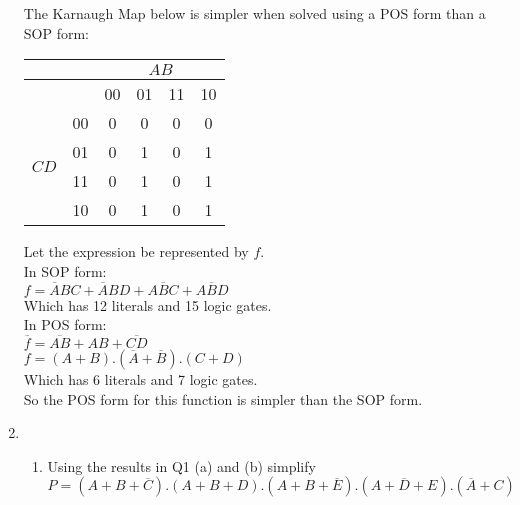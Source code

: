 \documentclass[10pt,\jkfside,a4paper]{article}
\begin{document}
\begin{enumerate}
The Karnaugh Map below is simpler when solved using a POS form than a SOP form:
\begin{center}
\begin{tabular}{|c|c|c|c|c|c|} 
\hline
& & \multicolumn{4}{|c|}{$AB$} \\
\hline
& & 00 & 01 & 11 & 10 \\ 
\hline
\multirow{4}{2em}{$CD$} 
& 00 & 0 & 0 & 0 & 0 \\
& 01 & 0 & 1 & 0 & 1 \\
& 11 & 0 & 1 & 0 & 1 \\
& 10 & 0 & 1 & 0 & 1 \\
\hline
\end{tabular}
\end{center}
Let the expression be represented by $f$.\\
In SOP form: \\
$f = \overline ABC + \overline ABD + A\overline BC + A\overline BD$\\
Which has 12 literals and 15 logic gates.\\
In POS form: \\
$\overline f = \overline{AB} + AB + \overline{CD}$\\
$f = (A + B).(\overline A + \overline B).(C + D)$\\
Which has 6 literals and 7 logic gates.\\
So the POS form for this function is simpler than the SOP form.

\item
\begin{enumerate}
\item{Using the results in Q1 (a) and (b) simplify\\
$P = (A + B + \overline C).(A + B + D).(A + B + \overline E).(A + \overline D + E).(\overline A + C)$}


\end{enumerate}
\end{enumerate}
\end{document}
